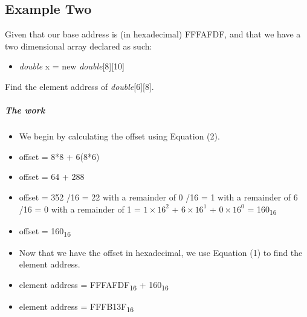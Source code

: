 \documentclass[12pt]{article}
\begin{document}
\subsection{Example Two}
Given that our base address is (in hexadecimal) FFFAFDF, and that we have a two dimensional array declared as such:
\begin{itemize}[leftmargin=1.5em]
\item[] \textit{double} x = new \textit{double}[8][10]
\end{itemize}
Find the element address of \textit{double}[6][8].
\subparagraph{The work}
\begin{itemize}[leftmargin=1.5em]
\item[] We begin by calculating the offset using Equation (2).
\item[] offset = 8*8 + 6(8*6)
\item[] offset = 64 + 288
\item[] offset = 352
/16 = 22 with a remainder of 0
/16 = 1 with a remainder of 6
/16 = 0 with a remainder of 1
 = $1\times16^2$ + $6\times16^1$ + $0\times16^0$
 = 160\textsubscript{16}
\item[] offset = 160\textsubscript{16}
\item[] Now that we have the offset in hexadecimal, we use Equation (1) to find the element address.
\item[] element address = FFFAFDF\textsubscript{16} + 160\textsubscript{16}
\item[] element address = FFFB13F\textsubscript{16}
\end{itemize}
\end{document}
